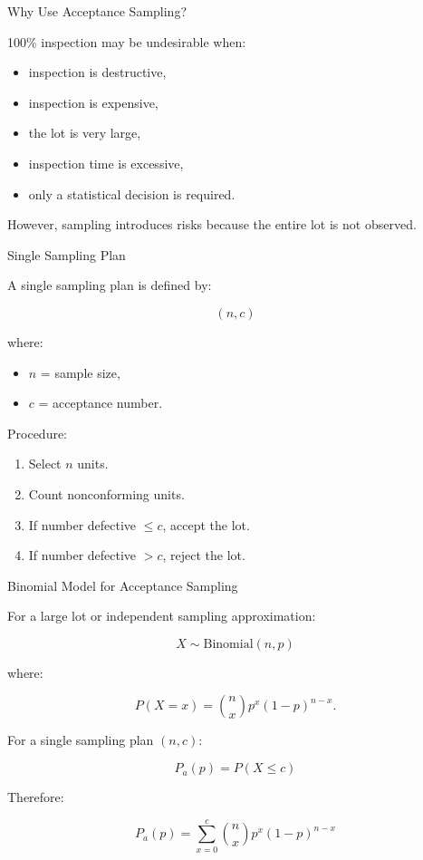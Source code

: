 \documentclass[aspectratio=169,10pt]{beamer}
\begin{document}
\begin{frame}[shrink=18]{Why Use Acceptance Sampling?}
\small

100\% inspection may be undesirable when:

\begin{itemize}
    \item inspection is destructive,
    \item inspection is expensive,
    \item the lot is very large,
    \item inspection time is excessive,
    \item only a statistical decision is required.
\end{itemize}

However, sampling introduces risks because the entire lot
is not observed.

\end{frame}


\begin{frame}[shrink=18]{Single Sampling Plan}
\small

A single sampling plan is defined by:

\[
\boxed{
(n,c)
}
\]

where:

\begin{itemize}
    \item \(n\) = sample size,
    \item \(c\) = acceptance number.
\end{itemize}

Procedure:

\begin{enumerate}
    \item Select \(n\) units.
    \item Count nonconforming units.
    \item If number defective \(\le c\), accept the lot.
    \item If number defective \(>c\), reject the lot.
\end{enumerate}

\end{frame}


\begin{frame}[shrink=18]{Binomial Model for Acceptance Sampling}
\small

For a large lot or independent sampling approximation:

\[
X\sim\mathrm{Binomial}(n,p)
\]

where:

\[
P(X=x)
=
{n\choose x}
p^x(1-p)^{n-x}.
\]

For a single sampling plan \((n,c)\):

\[
\boxed{
P_a(p)
=
P(X\le c)
}
\]

Therefore:

\[
\boxed{
P_a(p)
=
\sum_{x=0}^{c}
{n\choose x}
p^x(1-p)^{n-x}
}
\]

\end{frame}
\end{document}
